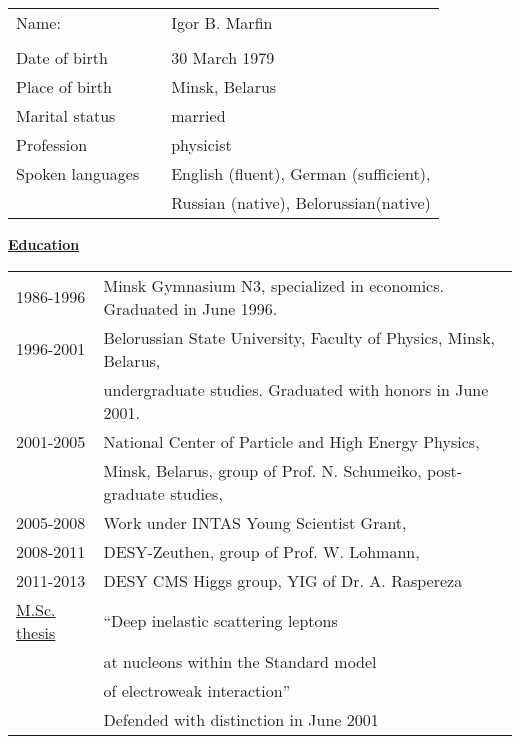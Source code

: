 

\vspace{4mm}

{\normalsize{

\begin{tabular}{lll}
Name: &  & Igor B. Marfin \\
      &  & \\
Date of birth    & & 30 March 1979 \\
Place of birth   & & Minsk, Belarus \\
Marital status   & & married \\
Profession       & & physicist \\
Spoken languages & & English (fluent), German (sufficient), \\
                 & & Russian (native), Belorussian(native)  \\
\end{tabular}

\vspace{3mm}

\begin{center}{\bf{{\underline{Education}}}}\end{center} 

\begin{tabular}{ll}
1986-1996      & Minsk Gymnasium N3,   specialized in economics.   Graduated  in June 1996.      \\
1996-2001      & Belorussian State University,  Faculty of Physics, Minsk, Belarus,       \\
               & undergraduate studies.   Graduated with honors in June 2001.      \\
2001-2005      & National Center of Particle and High Energy Physics,\\
		       & Minsk, Belarus, group of Prof. N. Schumeiko,  post-graduate studies,                         \\
2005-2008	   & Work under INTAS Young Scientist Grant, \\
2008-2011	   & DESY-Zeuthen, group of Prof. W. Lohmann, \\
2011-2013      & DESY CMS Higgs group, YIG  of Dr. A. Raspereza\\


\underline{M.Sc. thesis} & ``Deep inelastic scattering leptons \\
		& at nucleons within the  Standard model \\ 
		& of electroweak interaction'' \\
               & Defended with distinction in June 2001\\


\end{tabular}}}
